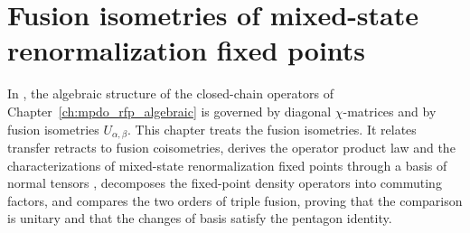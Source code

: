 \chapter{Fusion isometries of mixed-state renormalization fixed points}
\label{ch:mpdo_rfp_algebraic_fusion}

In \cite[Section~4]{Cirac2016MPDO_arXiv}, the algebraic structure of the
closed-chain operators of Chapter~\ref{ch:mpdo_rfp_algebraic} is governed by
diagonal $\chi$-matrices and by fusion isometries $U_{\alpha,\beta}$. This
chapter treats the fusion isometries. It relates transfer retracts to fusion
coisometries, derives the operator product law and the characterizations of
mixed-state renormalization fixed points through a basis of normal tensors
\cite[Theorem~4.14]{Cirac2016MPDO_arXiv}, decomposes the fixed-point density
operators into commuting factors, and compares the two orders of triple fusion,
proving that the comparison is unitary and that the changes of basis satisfy
the pentagon identity.


